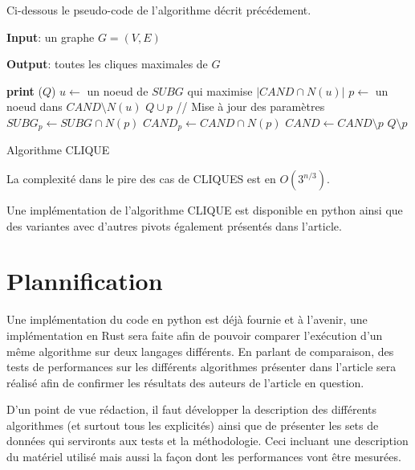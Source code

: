 \documentclass[12pt,a4paper]{report}
\begin{document}
Ci-dessous le pseudo-code de l'algorithme décrit précédement.
\begin{algorithm}[H]
  \textbf{Input}: un graphe $G = (V,E)$

  \textbf{Output}: toutes les cliques maximales de $G$
  \begin{algorithmic}[1]
       
        \State \textbf{print} ($ Q $)
      \Else
        \State $u \gets$ un noeud de $SUBG$ qui maximise $|CAND \cap N(u)|$
          \State $p \gets$ un noeud dans $CAND \setminus N(u)$
          \State $ Q \cup p $ 
          \State // Mise à jour des paramètres
          \State $SUBG_p \gets SUBG \cap N(p)$
          \State $CAND_p \gets CAND \cap N(p)$
          \State {}
          \State $CAND \gets CAND \setminus {p}$
          \State $ Q \setminus p $ 
        \EndWhile
      \EndIf
    \EndProcedure
    \State {}
  \end{algorithmic}
  \caption{\label{fig:cliques} Algorithme CLIQUE}
\end{algorithm}

La complexité dans le pire des cas de CLIQUES est en $ O(3^{n/3}) $\cite{CONTE20221}.

Une implémentation de l'algorithme CLIQUE est disponible en python ainsi que des variantes avec d'autres pivots également présentés dans l'article.

\section{Plannification}%
\label{sec:plan}

Une implémentation du code en python est déjà fournie et à l'avenir, une implémentation en Rust sera faite afin de pouvoir comparer l'exécution d'un même algorithme sur deux langages différents. En parlant de comparaison, des tests de performances sur les différents algorithmes présenter dans l'article sera réalisé afin de confirmer les résultats des auteurs de l'article en question.

D'un point de vue rédaction, il faut développer la description des différents algorithmes (et surtout tous les explicités) ainsi que de présenter les sets de données qui servironts aux tests et la méthodologie. Ceci incluant une description du matériel utilisé mais aussi la façon dont les performances vont être mesurées.
\end{document}
